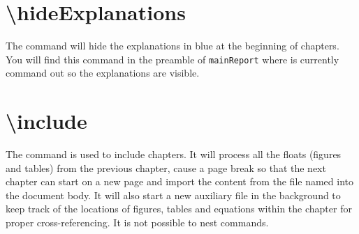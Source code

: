 \section{\textbackslash hideExplanations}
The command  will hide the explanations in blue at the beginning of chapters. You will find this command in the preamble of \texttt{mainReport} where is currently command out so the explanations are visible. 

\section{\textbackslash include}
The command  is used to include chapters. It will process all the floats (figures and tables) from the previous chapter, cause a page break so that the next chapter can start on a new page and import the content from the file named  into the document body. It will also start a new auxiliary file in the background to keep track of the locations of figures, tables and equations within the chapter for proper cross-referencing. It is not possible to nest  commands.

